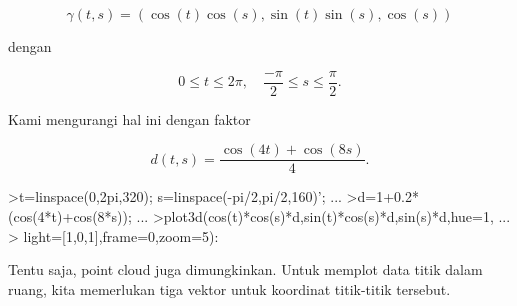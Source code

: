 \documentclass{article}
\begin{document}
\begin{eulernotebook}
\begin{eulercomment}
\end{eulercomment}
\begin{eulerformula}
\[
\gamma(t,s) = (\cos(t)\cos(s),\sin(t)\sin(s),\cos(s))
\]
\end{eulerformula}
\begin{eulercomment}
dengan

\end{eulercomment}
\begin{eulerformula}
\[
0 \le t \le 2\pi, \quad \frac{-\pi}{2} \le s \le \frac{\pi}{2}.
\]
\end{eulerformula}
\begin{eulercomment}
Kami mengurangi hal ini dengan faktor

\end{eulercomment}
\begin{eulerformula}
\[
d(t,s) = \frac{\cos(4t)+\cos(8s)}{4}.
\]
\end{eulerformula}
\begin{eulerprompt}
>t=linspace(0,2pi,320); s=linspace(-pi/2,pi/2,160)'; ...
>d=1+0.2*(cos(4*t)+cos(8*s)); ...
>plot3d(cos(t)*cos(s)*d,sin(t)*cos(s)*d,sin(s)*d,hue=1, ...
>  light=[1,0,1],frame=0,zoom=5):
\end{eulerprompt}
\begin{eulercomment}
Tentu saja, point cloud juga dimungkinkan. Untuk memplot data titik
dalam ruang, kita memerlukan tiga vektor untuk koordinat titik-titik
tersebut.


\end{eulercomment}
\end{eulernotebook}
\end{document}
